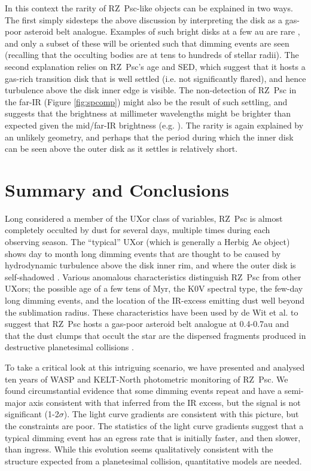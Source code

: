 \documentclass[]{rsos}
\begin{document}
In this context the rarity of RZ~Psc-like objects can be explained in two ways. The first
simply sidesteps the above discussion by interpreting the disk as a gas-poor asteroid
belt analogue. Examples of such bright disks at a few au are rare
\cite{2013MNRAS.433.2334K}, and only a subset of these will be oriented such that dimming
events are seen (recalling that the occulting bodies are at tens to hundreds of stellar
radii). The second explanation relies on RZ~Psc's age and SED, which suggest that it
hosts a gas-rich transition disk that is well settled (i.e. not significantly flared),
and hence turbulence above the disk inner edge is visible. The non-detection of RZ~Psc in
the far-IR (Figure \ref{fig:spcomp}) might also be the result of such settling, and
suggests that the brightness at millimeter wavelengths might be brighter than expected
given the mid/far-IR brightness
(e.g. \cite{2004A&A...421.1075D,2007prpl.conf..555D}). The rarity is again explained by
an unlikely geometry, and perhaps that the period during which the inner disk can be seen
above the outer disk as it settles is relatively short.

\section{Summary and Conclusions}\label{s:conc}

Long considered a member of the UXor class of variables, RZ~Psc is almost completely
occulted by dust for several days, multiple times during each observing season. The
``typical'' UXor (which is generally a Herbig Ae object) shows day to month long dimming
events that are thought to be caused by hydrodynamic turbulence above the disk inner rim,
and where the outer disk is self-shadowed \cite{2003ApJ...594L..47D}. Various anomalous
characteristics distinguish RZ~Psc from other UXors; the possible age of a few tens of
Myr, the K0V spectral type, the few-day long dimming events, and the location of the
IR-excess emitting dust well beyond the sublimation radius. These characteristics have
been used by de Wit et al. to suggest that RZ~Psc hosts a gas-poor asteroid belt analogue
at 0.4-0.7au and that the dust clumps that occult the star are the dispersed fragments
produced in destructive planetesimal collisions \cite{2013A&A...553L...1D}.

To take a critical look at this intriguing scenario, we have presented and analysed ten
years of WASP and KELT-North photometric monitoring of RZ~Psc. We found circumstantial
evidence that some dimming events repeat and have a semi-major axis consistent with that
inferred from the IR excess, but the signal is not significant (1-2$\sigma$). The light
curve gradients are consistent with this picture, but the constraints are poor. The
statistics of the light curve gradients suggest that a typical dimming event has an
egress rate that is initially faster, and then slower, than ingress. While this evolution
seems qualitatively consistent with the structure expected from a planetesimal collision,
quantitative models are needed.
\end{document}
